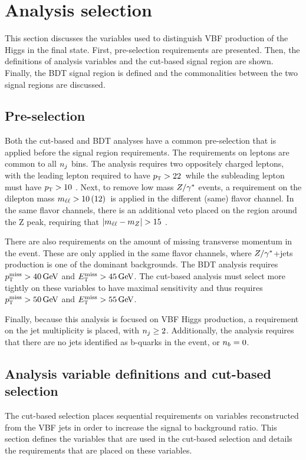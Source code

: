 \section{Analysis selection}

This section discusses the variables used to distinguish VBF production of the Higgs in the \HWWfull final state. First, pre-selection requirements are presented. Then, the definitions of analysis variables and the cut-based signal region are shown. Finally, the BDT signal region is defined and the commonalities between the two signal regions are discussed.  


\subsection{Pre-selection}
\label{sec:vbf_presel}
Both the cut-based and BDT analyses have a common pre-selection that is applied before the signal region requirements. The requirements on leptons are common to all $n_j$ bins. The analysis requires two oppositely charged leptons, with the leading lepton required to have $p_{\textrm{\footnotesize\sc t}} > 22$ \GeV\,while the subleading lepton must have $p_{\textrm{\footnotesize\sc t}} > 10$ \GeV. Next, to remove low mass $Z/\gamma^{\ast}$ events, a requirement on the dilepton mass $m_{\ell\ell} > 10\, (12)$ \GeV\,is applied in the different (same) flavor channel. In the same flavor channels, there is an additional veto placed on the region around the Z peak, requiring that $|m_{\ell\ell} - m_Z| > 15$ \GeV. 

There are also requirements on the amount of missing transverse momentum in the event. These are only applied in the same flavor channels, where $Z/\gamma^{\ast}$+jets production is one of the dominant backgrounds. The BDT analysis requires $\MPTj > 40 \GeV$ and $\MET > 45 \GeV$. The cut-based analysis must select more tightly on these variables to have maximal sensitivity and thus requires $\MPTj > 50 \GeV$ and $\MET > 55 \GeV$. 

Finally, because this analysis is focused on VBF Higgs production, a requirement on the jet multiplicity is placed, with $n_j \geq 2$. Additionally, the analysis requires that there are no jets identified as b-quarks in the event, or $n_b = 0$. 

\subsection{Analysis variable definitions and cut-based selection}

The cut-based selection places sequential requirements on variables reconstructed from the VBF jets in order to increase the signal to background ratio. This section defines the variables that are used in the cut-based selection and details the requirements that are placed on these variables. 

